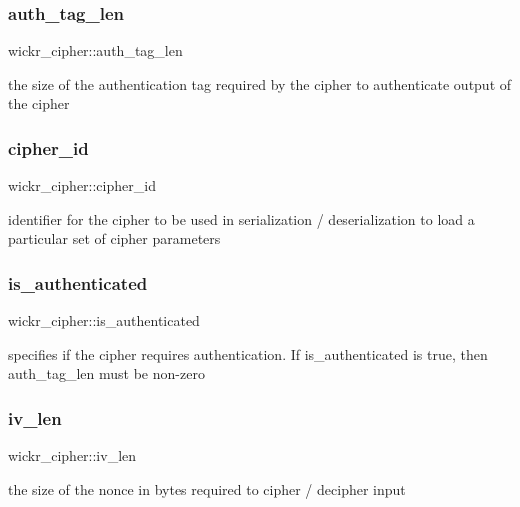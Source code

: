 \subsubsection{\texorpdfstring{auth\_tag\_len}{auth\_tag\_len}}
{\footnotesize\ttfamily wickr\+\_\+cipher\+::auth\+\_\+tag\+\_\+len}

the size of the authentication tag required by the cipher to authenticate output of the cipher \mbox{\label{structwickr__cipher_a2ce240f5bd396df05ddd4f30ba944b36}} 
\subsubsection{\texorpdfstring{cipher\_id}{cipher\_id}}
{\footnotesize\ttfamily wickr\+\_\+cipher\+::cipher\+\_\+id}

identifier for the cipher to be used in serialization / deserialization to load a particular set of cipher parameters \mbox{\label{structwickr__cipher_a21499cb78c9db301261c9d0d647b3e50}} 
\subsubsection{\texorpdfstring{is\_authenticated}{is\_authenticated}}
{\footnotesize\ttfamily wickr\+\_\+cipher\+::is\+\_\+authenticated}

specifies if the cipher requires authentication. If is\+\_\+authenticated is true, then auth\+\_\+tag\+\_\+len must be non-\/zero \mbox{\label{structwickr__cipher_a1cd39366934a31345d63ff42deeac1e3}} 
\subsubsection{\texorpdfstring{iv\_len}{iv\_len}}
{\footnotesize\ttfamily wickr\+\_\+cipher\+::iv\+\_\+len}

the size of the nonce in bytes required to cipher / decipher input \mbox{\label{structwickr__cipher_aec5724cc59d20ae5d7cbb73684b53457}} 
